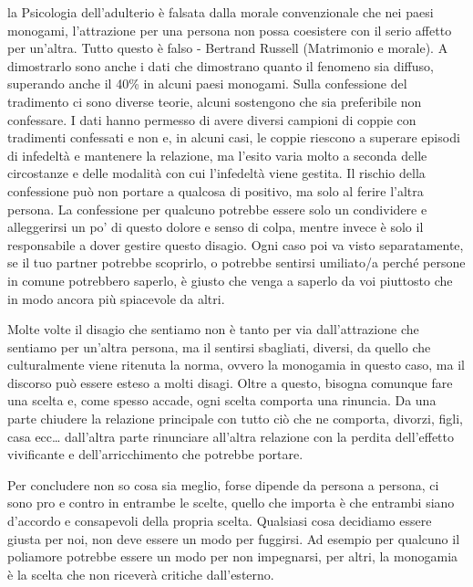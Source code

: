 \documentclass[12pt]{book} %
\begin{document}
la Psicologia dell'adulterio è falsata dalla morale convenzionale che nei paesi monogami,
l'attrazione per una persona non possa coesistere con il serio affetto per
un'altra. Tutto questo è falso - Bertrand Russell (Matrimonio e
morale).
A dimostrarlo sono anche i dati che dimostrano quanto il fenomeno sia diffuso, superando anche il 40\% in alcuni paesi monogami.
Sulla confessione del tradimento ci sono diverse teorie, alcuni sostengono che sia preferibile non confessare. I dati hanno permesso di avere diversi campioni di coppie con tradimenti confessati e non e, in alcuni casi, le coppie riescono a superare episodi di infedeltà e mantenere la relazione, ma l'esito varia molto a seconda delle circostanze e delle modalità con cui l'infedeltà viene gestita. Il rischio della confessione può non portare a qualcosa di positivo, ma solo al ferire l'altra persona. La confessione per qualcuno potrebbe essere solo un condividere e alleggerirsi un po' di questo dolore e senso di colpa, mentre invece è solo il responsabile a dover gestire questo disagio. 
Ogni caso poi va visto separatamente, se il tuo partner potrebbe scoprirlo, o potrebbe sentirsi umiliato/a perché persone in comune potrebbero saperlo, è giusto che venga a saperlo da voi piuttosto che in modo ancora più spiacevole da altri.

Molte volte il disagio che sentiamo non è tanto per via dall'attrazione che sentiamo per
un'altra persona, ma il sentirsi sbagliati, diversi, da quello che culturalmente viene ritenuta la
norma, ovvero la monogamia in questo caso, ma il discorso può essere esteso a molti disagi. Oltre a
questo, bisogna comunque fare una scelta e, come spesso accade, ogni scelta comporta una rinuncia. Da una parte
chiudere la relazione principale con tutto ciò che ne comporta, divorzi, figli, casa ecc…
dall'altra parte rinunciare all'altra relazione con la perdita
dell'effetto vivificante e dell'arricchimento che potrebbe portare. 

Per concludere non so cosa sia meglio, forse dipende da persona a persona, ci sono pro e contro in entrambe le scelte,
quello che importa è che entrambi siano d'accordo e consapevoli della propria scelta. Qualsiasi
cosa decidiamo essere giusta per noi, non deve essere un modo per fuggirsi. Ad esempio per qualcuno il poliamore
potrebbe essere un modo per non impegnarsi, per altri, la monogamia è la scelta che non riceverà critiche dall'esterno.
\end{document}
